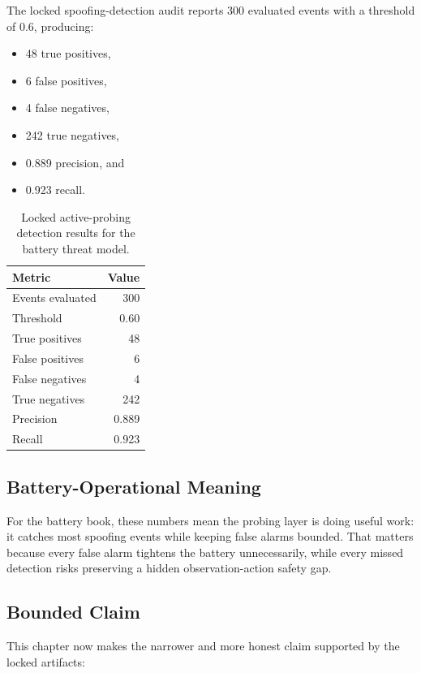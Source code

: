 The locked spoofing-detection audit reports 300 evaluated events with a
threshold of 0.6, producing:

\begin{itemize}
  \item 48 true positives,
  \item 6 false positives,
  \item 4 false negatives,
  \item 242 true negatives,
  \item 0.889 precision, and
  \item 0.923 recall.
\end{itemize}

\begin{table}[ht]
\centering
\caption{Locked active-probing detection results for the battery threat model.}
\label{tab:spoof-results}
\begin{tabular}{lr}
\toprule
\textbf{Metric} & \textbf{Value} \\
\midrule
Events evaluated & 300 \\
Threshold & 0.60 \\
True positives & 48 \\
False positives & 6 \\
False negatives & 4 \\
True negatives & 242 \\
Precision & 0.889 \\
Recall & 0.923 \\
\bottomrule
\end{tabular}
\end{table}

\subsection{Battery-Operational Meaning}

For the battery book, these numbers mean the probing layer is doing useful
work: it catches most spoofing events while keeping false alarms bounded.
That matters because every false alarm tightens the battery unnecessarily,
while every missed detection risks preserving a hidden observation-action
safety gap.

\subsection{Bounded Claim}

This chapter now makes the narrower and more honest claim supported by the
locked artifacts:

